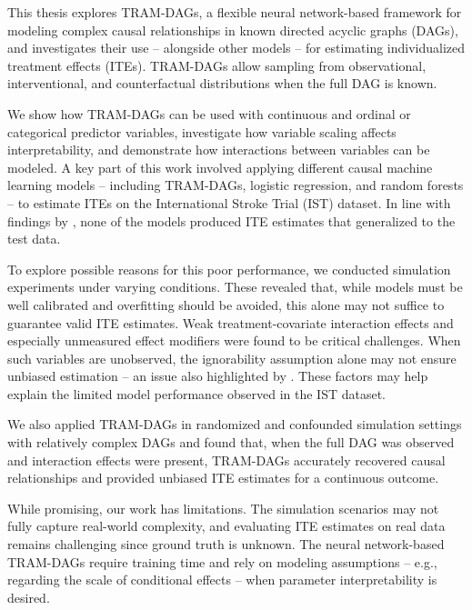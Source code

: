 \documentclass[11pt,a4paper,twoside]{book}
\begin{document}
This thesis explores TRAM-DAGs, a flexible neural network-based framework for modeling complex causal relationships in known directed acyclic graphs (DAGs), and investigates their use -- alongside other models -- for estimating individualized treatment effects (ITEs). TRAM-DAGs allow sampling from observational, interventional, and counterfactual distributions when the full DAG is known. 

We show how TRAM-DAGs can be used with continuous and ordinal or categorical predictor variables, investigate how variable scaling affects interpretability, and demonstrate how interactions between variables can be modeled. A key part of this work involved applying different causal machine learning models -- including TRAM-DAGs, logistic regression, and random forests -- to estimate ITEs on the International Stroke Trial (IST) dataset. In line with findings by \citet{chen2025}, none of the models produced ITE estimates that generalized to the test data.

To explore possible reasons for this poor performance, we conducted simulation experiments under varying conditions. These revealed that, while models must be well calibrated and overfitting should be avoided, this alone may not suffice to guarantee valid ITE estimates. Weak treatment-covariate interaction effects and especially unmeasured effect modifiers were found to be critical challenges. When such variables are unobserved, the ignorability assumption alone may not ensure unbiased estimation -- an issue also highlighted by \citet{vegetabile2021}. These factors may help explain the limited model performance observed in the IST dataset.

We also applied TRAM-DAGs in randomized and confounded simulation settings with relatively complex DAGs and found that, when the full DAG was observed and interaction effects were present, TRAM-DAGs accurately recovered causal relationships and provided unbiased ITE estimates for a continuous outcome.

While promising, our work has limitations. The simulation scenarios may not fully capture real-world complexity, and evaluating ITE estimates on real data remains challenging since ground truth is unknown. The neural network-based TRAM-DAGs require training time and rely on modeling assumptions -- e.g., regarding the scale of conditional effects -- when parameter interpretability is desired.
\end{document}
